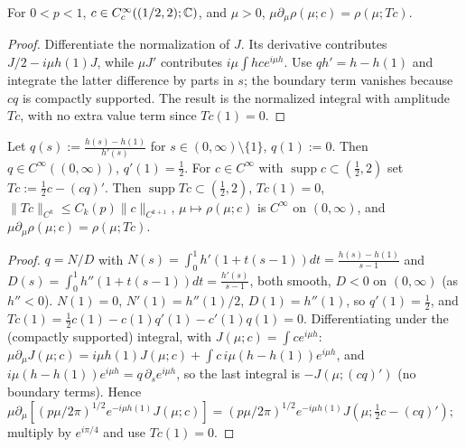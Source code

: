 \begin{lemma}
  \label{lem:c03_sp_euler_identity}
  For $0<p<1$, $c\in C_c^\infty((1/2,2);\mathbb{C})$, and $\mu>0$,
  $\mu\partial_\mu\rho(\mu;c)=\rho(\mu;Tc)$.
\end{lemma}
\begin{proof}
  Differentiate the normalization of $J$. Its derivative contributes
  $J/2-i\mu h(1)J$, while $\mu J'$ contributes $i\mu\int h c e^{i\mu h}$.
  Use $q h'=h-h(1)$ and integrate the latter difference by parts in $s$;
  the boundary term vanishes because $cq$ is compactly supported. The result is the normalized
  integral with amplitude $Tc$, with no extra value term since $Tc(1)=0$.
\end{proof}

\begin{lemma}
  \label{lem:c03_sp_euler}
  Let $q(s):=\frac{h(s)-h(1)}{h'(s)}$ for $s\in(0,\infty)\setminus\{1\}$, $q(1):=0$. Then $q\in C^\infty((0,\infty))$, $q'(1)=\frac12$. For $c\in C^\infty$ with $\operatorname{supp}c\subset(\frac12,2)$ set $Tc:=\frac12c-(cq)'$. Then $\operatorname{supp}Tc\subset(\frac12,2)$, $Tc(1)=0$, $\|Tc\|_{C^k}\le C_k(p)\|c\|_{C^{k+1}}$, $\mu\mapsto\rho(\mu;c)$ is $C^\infty$ on $(0,\infty)$, and
  $\mu\partial_\mu\rho(\mu;c)=\rho(\mu;Tc)$.
\end{lemma}
\begin{proof}
  $q=N/D$ with $N(s)=\int_0^1h'(1+t(s-1))dt=\frac{h(s)-h(1)}{s-1}$ and $D(s)=\int_0^1h''(1+t(s-1))dt=\frac{h'(s)}{s-1}$, both smooth, $D<0$ on $(0,\infty)$ (as $h''<0$). $N(1)=0$, $N'(1)=h''(1)/2$, $D(1)=h''(1)$, so $q'(1)=\frac12$, and $Tc(1)=\frac12c(1)-c(1)q'(1)-c'(1)q(1)=0$.
  Differentiating under the (compactly supported) integral, with $J(\mu;c)=\int ce^{i\mu h}$:
  $\mu\partial_\mu J(\mu;c)=i\mu h(1)J(\mu;c)+\int c\,i\mu(h-h(1))e^{i\mu h}$, and $i\mu(h-h(1))e^{i\mu h}=q\,\partial_se^{i\mu h}$, so the last integral is $-J(\mu;(cq)')$ (no boundary terms).
  Hence $\mu\partial_\mu[(p\mu/2\pi)^{1/2}e^{-i\mu h(1)}J(\mu;c)]=(p\mu/2\pi)^{1/2}e^{-i\mu h(1)}J(\mu;\frac12c-(cq)')$; multiply by $e^{i\pi/4}$ and use $Tc(1)=0$.
\end{proof}


